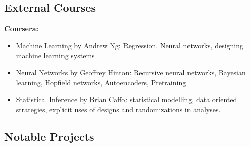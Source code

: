 \documentclass[10pt,letterpaper,sans]{moderncv}        %
\begin{document}
\subsection{External Courses}
\textbf{Coursera:}
\begin{itemize}
\item Machine Learning by Andrew Ng: Regression, Neural networks, designing machine learning systems
\item Neural Networks by Geoffrey Hinton: Recursive neural networks, Bayesian learning, Hopfield networks, Autoencoders, Pretraining
\item Statistical Inference by Brian Caffo: statistical modelling, data oriented strategies, explicit uses of designs and randomizations in analyses.
\end{itemize}

\vspace{4pt}

\subsection{Notable Projects}

\vspace{5pt}
\end{document}
